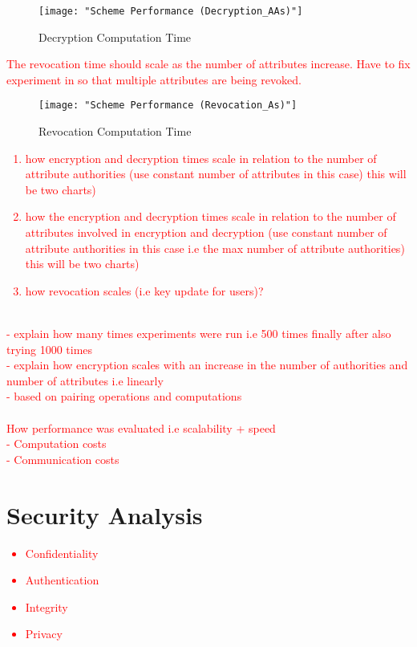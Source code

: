 \begin{figure}[h]
	\centering
	\texttt{[image: "Scheme Performance (Decryption\_AAs)"]}
	\caption{Decryption Computation Time}
	\label{fig:res_dec_aas}
\end{figure}

\textcolor{red}{The revocation time should scale as the number of attributes increase. Have to fix experiment in so that multiple attributes are being revoked.}

\begin{figure}[]
	\centering
	\texttt{[image: "Scheme Performance (Revocation\_As)"]}
	\caption{Revocation Computation Time}
	\label{fig:res_rev_as}
\end{figure}

\textcolor{red}{
\begin{enumerate}
	\item how encryption and decryption times scale in relation to the number of attribute authorities (use constant number of attributes in this case)  \textcolor{red}{this will be two charts)}
	\item how the encryption and decryption times scale in relation to the number of attributes involved in encryption and decryption (use constant number of attribute authorities in this case i.e the max number of attribute authorities)  \textcolor{red}{this will be two charts)}
	\item how revocation scales (i.e key update for users)?
\end{enumerate}
}

\textcolor{red}{\\- explain how many times experiments were run i.e 500 times finally after also trying 1000 times \\- explain how encryption scales with an increase in the number of authorities and number of attributes i.e linearly \\- based on pairing operations and computations \\ \\ How performance was evaluated i.e scalability + speed \\- Computation costs \\- Communication costs}

\section{Security Analysis}

\textcolor{red}{
\begin{itemize}
	\item Confidentiality
	\item Authentication
	\item Integrity
	\item Privacy
\end{itemize}
}

